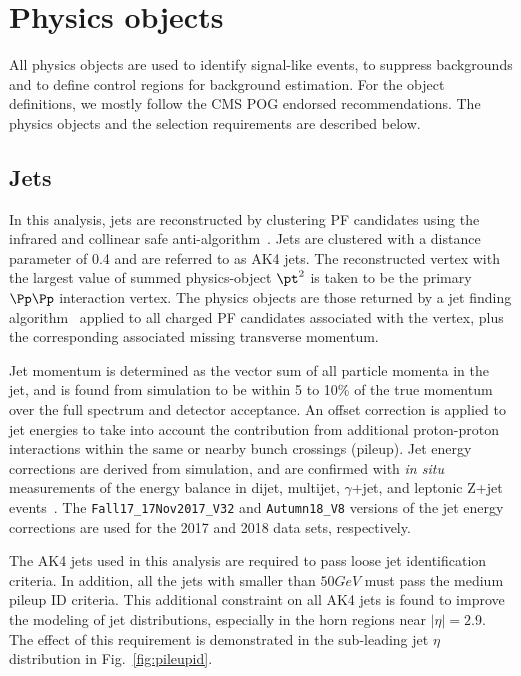 \section{Physics objects} \label{sec:objects}

All physics objects are used to identify signal-like events, to suppress backgrounds and to define control regions
for background estimation. For the object definitions, we mostly follow the CMS POG endorsed recommendations. The physics 
objects and the selection requirements are described below.

\subsection{Jets}
\label{sec:objects_ak4}
In this analysis, jets are reconstructed by clustering PF candidates
using the infrared and collinear safe anti-\kt algorithm~\cite{Cacciari:2008gp}. Jets are clustered
with a distance parameter of 0.4 and are referred to as AK4 jets.
The reconstructed vertex with the largest value of summed physics-object $\pt^2$ is taken to
be the primary $\Pp\Pp$ interaction vertex. The physics objects are those returned by a
jet finding algorithm~\cite{Cacciari:2008gp,Cacciari:2011ma} applied to all charged PF candidates
associated with the vertex, plus the corresponding associated missing transverse momentum.

Jet momentum is determined as the vector sum of all particle momenta in the jet,
and is found from simulation to be within 5 to 10\% of the true momentum over the full \pt
spectrum and detector acceptance. An offset correction is applied to jet energies to take
into account the contribution from additional proton-proton interactions within the
same or nearby bunch crossings (pileup). Jet energy corrections are derived from simulation,
and are confirmed with {\it in situ} measurements of the energy balance in dijet, multijet,
$\gamma$+jet, and leptonic Z+jet events~\cite{Khachatryan:2016kdb}. The \texttt{Fall17\_17Nov2017\_V32} and \texttt{Autumn18\_V8}
versions of the jet energy corrections are used for the 2017 and 2018 data sets, respectively.

The AK4 jets used in this analysis are required to pass loose jet identification criteria.
In addition, all the jets with \pt smaller than $50 GeV$ must pass the medium pileup ID criteria. This additional constraint
on all AK4 jets is found to improve the modeling of jet distributions, especially in the horn regions near $|\eta| = 2.9$. 
The effect of this requirement is demonstrated in the sub-leading jet $\eta$ distribution in Fig.~\ref{fig:pileupid}.

